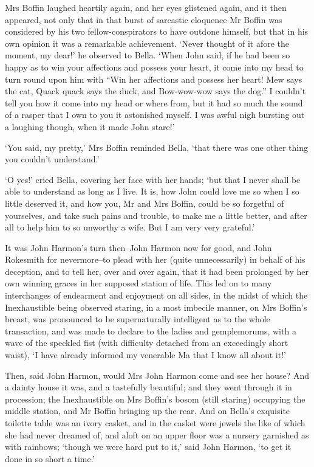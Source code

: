 Mrs Boffin laughed heartily again, and her eyes glistened again, and
it then appeared, not only that in that burst of sarcastic eloquence
Mr Boffin was considered by his two fellow-conspirators to have outdone
himself, but that in his own opinion it was a remarkable achievement.
‘Never thought of it afore the moment, my dear!’ he observed to Bella.
‘When John said, if he had been so happy as to win your affections and
possess your heart, it come into my head to turn round upon him with
“Win her affections and possess her heart! Mew says the cat, Quack quack
says the duck, and Bow-wow-wow says the dog.” I couldn’t tell you how
it come into my head or where from, but it had so much the sound of a
rasper that I own to you it astonished myself. I was awful nigh bursting
out a laughing though, when it made John stare!’

‘You said, my pretty,’ Mrs Boffin reminded Bella, ‘that there was one
other thing you couldn’t understand.’

‘O yes!’ cried Bella, covering her face with her hands; ‘but that I
never shall be able to understand as long as I live. It is, how John
could love me so when I so little deserved it, and how you, Mr and Mrs
Boffin, could be so forgetful of yourselves, and take such pains and
trouble, to make me a little better, and after all to help him to so
unworthy a wife. But I am very very grateful.’

It was John Harmon’s turn then--John Harmon now for good, and John
Rokesmith for nevermore--to plead with her (quite unnecessarily) in
behalf of his deception, and to tell her, over and over again, that it
had been prolonged by her own winning graces in her supposed station of
life. This led on to many interchanges of endearment and enjoyment
on all sides, in the midst of which the Inexhaustible being observed
staring, in a most imbecile manner, on Mrs Boffin’s breast, was
pronounced to be supernaturally intelligent as to the whole transaction,
and was made to declare to the ladies and gemplemorums, with a wave of
the speckled fist (with difficulty detached from an exceedingly short
waist), ‘I have already informed my venerable Ma that I know all about
it!’

Then, said John Harmon, would Mrs John Harmon come and see her house?
And a dainty house it was, and a tastefully beautiful; and they went
through it in procession; the Inexhaustible on Mrs Boffin’s bosom (still
staring) occupying the middle station, and Mr Boffin bringing up the
rear. And on Bella’s exquisite toilette table was an ivory casket, and
in the casket were jewels the like of which she had never dreamed of,
and aloft on an upper floor was a nursery garnished as with rainbows;
‘though we were hard put to it,’ said John Harmon, ‘to get it done in so
short a time.’

